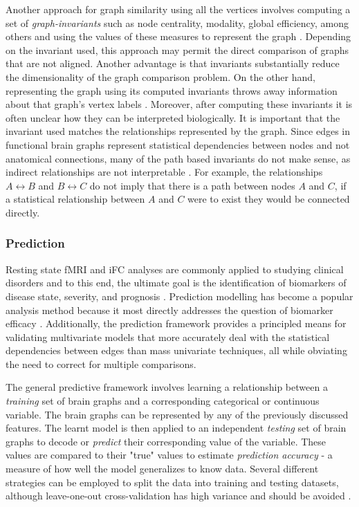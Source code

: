 Another approach for graph similarity using all the vertices involves computing a set of \emph{graph-invariants} such as node centrality, modality, global efficiency, among others and using the values of these measures to represent the graph \cite{Rubinov2010,Bullmore2011}. Depending on the invariant used, this approach may permit the direct comparison of graphs that are not aligned. Another advantage is that invariants substantially reduce the dimensionality of the graph comparison problem. On the other hand, representing the graph using its computed invariants throws away information about that graph's vertex labels \cite{Vogelstein2013}. Moreover, after computing these invariants it is often unclear how they can be interpreted biologically. It is important that the invariant used matches the relationships represented by the graph. Since edges in functional brain graphs represent statistical dependencies between nodes and not anatomical connections, many of the path based invariants do not make sense, as indirect relationships are not interpretable \cite{Rubinov2010}. For example, the relationships $A \leftrightarrow B$ and $B \leftrightarrow C$ do not imply that there is a path between nodes $A$ and $C$, if a statistical relationship between $A$ and $C$ were to exist they would be connected directly.   

\subsubsection{Prediction}

Resting state fMRI and iFC analyses are commonly applied to studying clinical disorders and to this end, the ultimate goal is the identification of biomarkers of disease state, severity, and prognosis \cite{Castellanos2013}. Prediction modelling has become a popular analysis method because it most directly addresses the question of biomarker efficacy \cite{Craddock2009, Dosenbach2010, Richiardi2013}. Additionally, the prediction framework provides a principled means for validating multivariate models that more accurately deal with the statistical dependencies between edges than mass univariate techniques, all while obviating the need to correct for multiple comparisons. 

The general predictive framework involves learning a relationship between a \emph{training} set of brain graphs and a corresponding categorical or continuous variable. The brain graphs can be represented by any of the previously discussed features. The learnt model is then applied to an independent \emph{testing} set of brain graphs to decode or \emph{predict} their corresponding value of the variable. These values are compared to their "true" values to estimate \emph{prediction accuracy} - a measure of how well the model generalizes to know data. Several different strategies can be employed to split the data into training and testing datasets, although leave-one-out cross-validation has high variance and should be avoided \cite{james2014introduction}. 

